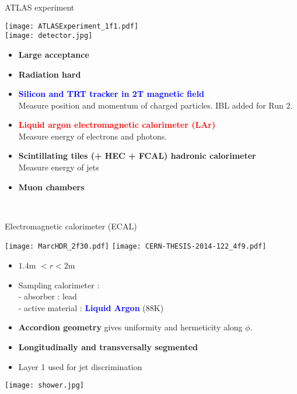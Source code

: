 \begin{frame}{ATLAS experiment}
  \begin{minipage}{0.49\linewidth}
    \texttt{[image: ATLASExperiment\_1f1.pdf]}\\
    \texttt{[image: detector.jpg]}
  \end{minipage}
  \hfill
  \begin{minipage}{0.49\linewidth}
    \begin{itemize}
    \item {\bf Large acceptance}
    \item {\bf Radiation hard}
      \newline
    \item \textcolor{blue}{\bf Silicon and TRT tracker in 2T magnetic field}\\
      Measure position and momentum of charged particles.
      IBL added for Run 2.
    \item \textcolor{red}{\bf Liquid argon electromagnetic calorimeter (LAr)} \\
      Measure energy of electrons and photons.
    \item {\bf Scintillating tiles (+ HEC + FCAL) hadronic calorimeter} \\
      Measure energy of jets
    \item {\bf Muon chambers}
    \end{itemize}
  \end{minipage}\\
\end{frame}

\begin{frame}{ Electromagnetic calorimeter (ECAL) }
  \begin{minipage}{0.4\linewidth}
    \texttt{[image: MarcHDR\_2f30.pdf]}\newline
    \centering
    \texttt{[image: CERN-THESIS-2014-122\_4f9.pdf]}
  \end{minipage}
  \hfill
  \begin{minipage}{0.59\linewidth}
    \begin{itemize}
    \item $1.4$m $<r<2$m
    \item Sampling calorimeter : \\
      - absorber : lead\\
      - active material : \textcolor{blue}{\bf Liquid Argon }($88$K)\\
    \item {\bf Accordion geometry} gives uniformity and hermeticity along $\phi$.
    \item {\bf Longitudinally and transversally segmented}
    \item Layer 1 used for jet discrimination
      
    \end{itemize}
    \centering
    \texttt{[image: shower.jpg]}
  \end{minipage}
\end{frame}

